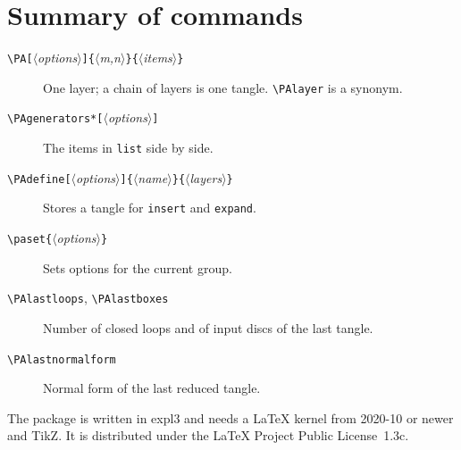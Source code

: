 \documentclass[11pt]{article}
\newcommand\opt[1]{\texttt{#1}}
\newcommand\cs[1]{\texttt{\textbackslash#1}}
\newcommand\meta[1]{\ensuremath{\langle}\textit{#1}\ensuremath{\rangle}}
\newcommand\marg[1]{\texttt{\{}\meta{#1}\texttt{\}}}
\newcommand\oarg[1]{\texttt{[}\meta{#1}\texttt{]}}
\begin{document}
\section{Summary of commands}

\begin{description}
  \item[\cs{PA}\oarg{options}\marg{m,n}\marg{items}] One layer; a chain of
    layers is one tangle. \cs{PAlayer} is a synonym.
  \item[\cs{PAgenerators}\texttt{*}\oarg{options}] The items in \opt{list}
    side by side.
  \item[\cs{PAdefine}\oarg{options}\marg{name}\marg{layers}] Stores a
    tangle for \opt{insert} and \opt{expand}.
  \item[\cs{paset}\marg{options}] Sets options for the current group.
  \item[\cs{PAlastloops}, \cs{PAlastboxes}] Number of closed loops and of
    input discs of the last tangle.
  \item[\cs{PAlastnormalform}] Normal form of the last reduced tangle.
\end{description}

The package is written in \textsf{expl3} and needs a \LaTeX{} kernel from
2020-10 or newer and TikZ. It is distributed under the \LaTeX{} Project
Public License~1.3c.
\end{document}
